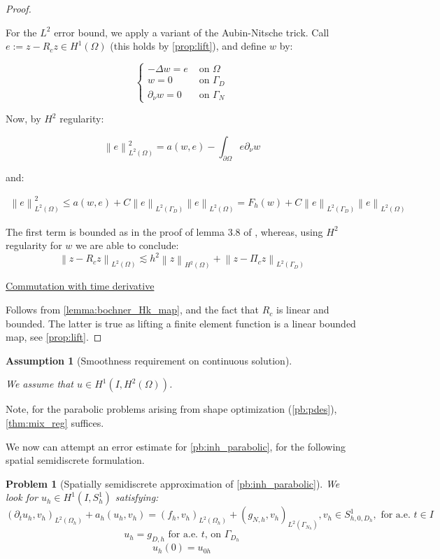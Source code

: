 \documentclass[english,a4paper,9pt,oneside]{scrbook}	%
\theoremstyle{break}
\newtheorem{ass}[equation]{Assumption}
\newtheorem{pb}[equation]{Problem}
\newenvironment{mproof}[1][\proofname]{%
  \begin{proof}[#1]$ $\par\nobreak\ignorespaces
}{%
  \end{proof}
}
\renewcommand*{\proofname}{Proof}
\theoremstyle{remark}
\newcommand{\norm}[1]{\left\lVert#1\right\rVert}
\begin{document}
\begin{appendices}
\begin{mproof}
For the $L^2$ error bound, we apply a variant of the Aubin-Nitsche trick. Call $e:= z - R_c z \in H^1(\Omega)$ (this holds by \cref{prop:lift}), and define $w$ by:

$$
\left\{\begin{matrix}
-\Delta w = e & \text{ on } \Omega \\ 
w = 0 & \text{ on } \Gamma_D \\ 
\partial_\nu w = 0 & \text{ on } \Gamma_N 
\end{matrix}\right.
$$

Now, by $H^2$ regularity:

$$\norm{e}^2_{L^2(\Omega)} = a(w,e) - \int_{\partial \Omega} e \partial_\nu w  $$

and:

\begin{align*}
\norm{e}^2_{L^2(\Omega)} \leq a(w,e) + C \norm{e}_{L^2(\Gamma_D)}\norm{e}_{L^2( \Omega)} = F_h(w) + C \norm{e}_{L^2(\Gamma_D)}\norm{e}_{L^2( \Omega)}
\end{align*}

The first term is bounded as in the proof of lemma 3.8 of \cite{ranner}, whereas, using $H^2$ regularity for $w$ we are able to conclude:
$$\norm{z-R_c z}_{L^2(\Omega)}\lesssim h^2\norm{z}_{H^2(\Omega)} + \norm{z-\Pi_c z}_{L^2(\Gamma_D)} $$

\underline{Commutation with time derivative}

Follows from \cref{lemma:bochner_Hk_map}, and the fact that $R_c$ is linear and bounded. The latter is true as lifting a finite element function is a linear bounded map, see \cref{prop:lift}.
\end{mproof}

\begin{ass}[Smoothness requirement on continuous solution]
\label{ass:smoothness_par_discr}

We assume that $u \in H^1(I, H^2(\Omega))$.
\end{ass}

Note, for the parabolic problems arising from shape optimization (\cref{pb:pdes}), \cref{thm:mix_reg} suffices.

We now can attempt an error estimate for \cref{pb:inh_parabolic}, for the following spatial semidiscrete formulation.

\begin{pb}[Spatially semidiscrete approximation of \cref{pb:inh_parabolic}]
\label{pb:inh_parabolic_discr}
We look for $u_h \in H^1(I, S^1_h)$ satisfying: 
$$(\partial_t u_h, v_h)_{L^2(\Omega_h)} + a_h(u_h, v_h) = (f_h, v_h)_{L^2(\Omega_h)} + (g_{N,h}, v_h)_{L^2(\Gamma_{N_h})}, v_h \in S^1_{h,0,D_h}, \text{ for a.e. }t\in I$$
$$u_h=g_{D,h}\text{ for a.e. }t \text{,  on } \Gamma_{D_h}$$
$$u_h(0)=u_{0h}$$


\end{pb}
\end{appendices}
\end{document}
